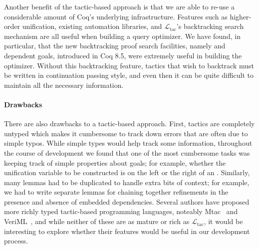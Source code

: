 \documentclass[preprint]{sigplanconf}
\newcommand{\ltac}[0]{\ensuremath{\mathcal{L}_{\mathrm{tac}}}}
\begin{document}
Another benefit of the tactic-based approach is that we are able to re-use a considerable amount of Coq's underlying infrastructure.
Features such as higher-order unification, existing automation libraries, and \ltac's backtracking search mechanism are all useful when building a query optimizer.
We have found, in particular, that the new backtracking proof search facilities, namely \coqe{+} and dependent goals, introduced in Coq 8.5, were extremely useful in building the optimizer.
Without this backtracking feature, tactics that wish to backtrack must be written in continuation passing style, and even then it can be quite difficult to maintain all the necessary information.

\paragraph{Drawbacks}
There are also drawbacks to a tactic-based approach.
First, tactics are completely untyped which makes it cumbersome to track down errors that are often due to simple typos.
While simple types would help track some information, throughout the course of development we found that one of the most cumbersome tasks was keeping track of simple properties about goals; for example, whether the unification variable to be constructed is on the left or the right of an .
Similarly, many lemmas had to be duplicated to handle extra bits of context; for example, we had to write separate lemmas for chaining together refinements in the presence and absence of embedded dependencies.
Several authors have proposed more richly typed tactic-based programming languages, noteably Mtac~\cite{ziliani2013mtac} and VeriML~\cite{stampoulis2010veriml}, and while neither of these are as mature or rich as \ltac, it would be interesting to explore whether their features would be useful in our development process.
\end{document}
